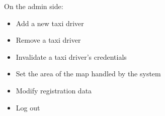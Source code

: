 \documentclass{article}
\begin{document}
On the admin side:\@
\begin{itemize}
	\item Add a new taxi driver
	\item Remove a taxi driver
	\item Invalidate a taxi driver's credentials %
	\item Set the area of the map handled by the system %
	\item Modify registration data
	\item Log out
\end{itemize}
\end{document}
